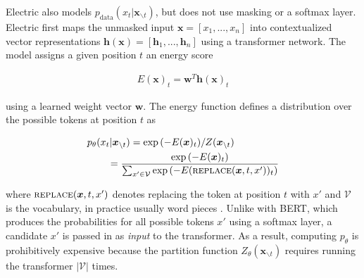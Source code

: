 \documentclass[11pt,a4paper]{article}
\newcommand{\replace}[3] {
    \textsc{replace}(#1, #2, #3)
}
\newcommand{\alns}[1] {
	\begin{align*} #1 \end{align*}
}
\newcommand{\Z}{Z_\theta(\cntxt)}
\newcommand{\bx}{\bm{x}}
\newcommand{\bw}{\bm{w}}
\newcommand{\bh}{\bm{h}}
\newcommand{\cntxt}{\bx_{\backslash t}}
\newcommand{\vocab}{\mathcal{V}}
\newcommand{\pdata}{p_\text{data}}
\begin{document}
Electric also models $\pdata(x_t | \cntxt)$, but does not use masking or a softmax layer.
Electric first maps the unmasked input $\bx = [x_1, ..., x_n]$ into contextualized vector representations $\bh(\bx) = [\bh_1, ..., \bh_n]$ using a transformer network.
The model assigns a given position $t$ an energy score
\alns{
E(\bx)_t = \bw^T \bh(\bx)_t
}
using a learned weight vector $\bw$.
The energy function defines a distribution over the possible tokens at position $t$ as
\alns{
    p_\theta(x_t | \cntxt) &= \exp{(-E(\bx)_t)} / Z(\cntxt) \\
    &\hspace{-8mm} = \frac{\exp{(-E(\bx)_t)}}{\sum_{x' \in \vocab} \exp{(-E(\replace{\bx}{t}{x'})_t)}}
}
where $\replace{\bx}{t}{x'}$ denotes replacing the token at position $t$ with $x'$ and $\vocab$ is the vocabulary, in practice usually word pieces \cite{Sennrich2016NeuralMT}.
Unlike with BERT, which produces the probabilities for all possible tokens $x'$ using a softmax layer, a candidate $x'$ is passed in as {\it input} to the transformer. 
As a result, computing $p_\theta$ is prohibitively expensive because the partition function $\Z$ requires running the transformer $|\vocab|$ times.
\end{document}
